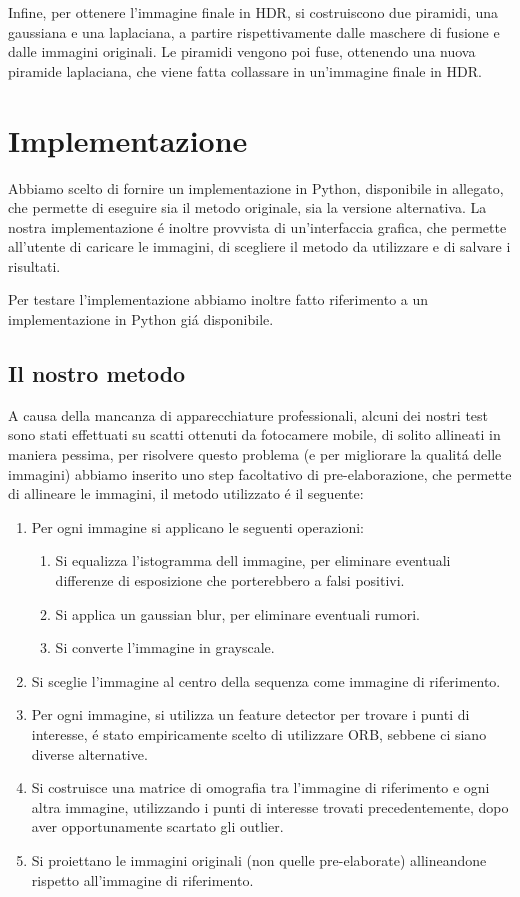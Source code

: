 \documentclass[10pt,journal,cspaper,compsoc]{IEEEtran}
\begin{document}
Infine, per ottenere l'immagine finale in HDR, si costruiscono due piramidi, una gaussiana 
e una laplaciana, a partire rispettivamente dalle maschere di fusione e dalle immagini 
originali. 
Le piramidi vengono poi fuse, ottenendo una nuova piramide laplaciana, che viene fatta collassare 
in un'immagine finale in HDR.\@

\section{Implementazione}
Abbiamo scelto di fornire un implementazione in Python, disponibile in allegato, che permette di
eseguire sia il metodo originale, sia la versione alternativa. La nostra implementazione
é inoltre provvista di un'interfaccia grafica, che permette all'utente di caricare 
le immagini, di scegliere il metodo da utilizzare e di salvare i risultati.

Per testare l'implementazione abbiamo inoltre fatto riferimento a un implementazione in Python
giá disponibile\cite{github:arpesenti}.

\subsection{Il nostro metodo}

A causa della mancanza di apparecchiature professionali, alcuni dei nostri test sono stati
effettuati su scatti ottenuti da fotocamere mobile, di solito allineati in maniera pessima,
per risolvere questo problema (e per migliorare la qualitá delle immagini) abbiamo inserito 
uno step facoltativo di pre-elaborazione, che permette di allineare le immagini, il metodo 
utilizzato é il seguente:

\begin{enumerate}
    \item Per ogni immagine si applicano le seguenti operazioni:
    \begin{enumerate}
        \item Si equalizza l'istogramma dell immagine, per eliminare eventuali differenze di esposizione
        che porterebbero a falsi positivi.
        \item Si applica un gaussian blur, per eliminare eventuali rumori.
        \item Si converte l'immagine in grayscale.
    \end{enumerate}
    \item Si sceglie l'immagine al centro della sequenza come immagine di riferimento.
    \item Per ogni immagine, si utilizza un feature detector per trovare i punti di interesse, 
    é stato empiricamente scelto di utilizzare ORB\cite{ICCV:ORB}, sebbene ci siano diverse 
    alternative.\cite{Lowe:SIFT, Bay:SURF}
    \item Si costruisce una matrice di omografia tra l'immagine di riferimento e ogni altra immagine, 
    utilizzando i punti di interesse trovati precedentemente, dopo aver opportunamente scartato 
    gli outlier.
    \item Si proiettano le immagini originali (non quelle pre-elaborate) allineandone 
    rispetto all'immagine di riferimento.
\end{enumerate}
\end{document}
